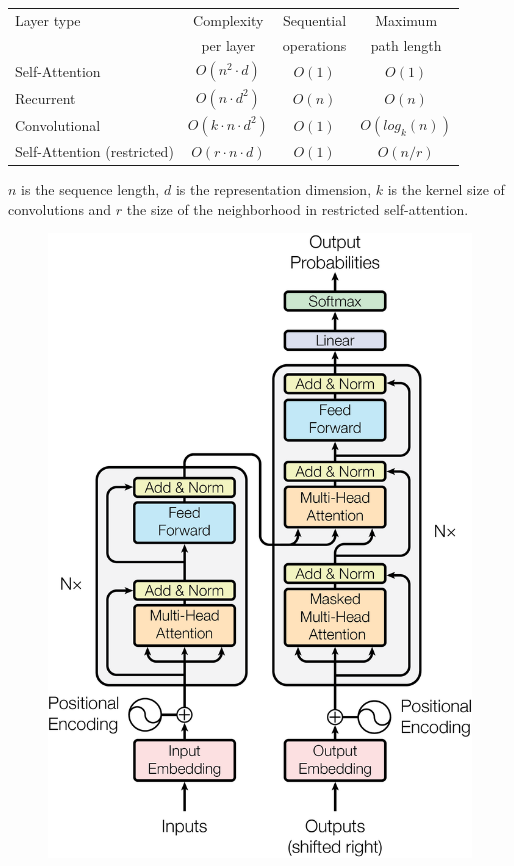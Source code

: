 \begin{table}
\centering
\begin{tabular}{l|ccc}
\toprule
Layer type        &   Complexity             &  Sequential & Maximum        \\
                  &   per layer              &  operations & path length    \\
\midrule
Self-Attention    & $O(n^2 \cdot d)$         & $O(1)$      & $O(1)$         \\
Recurrent         & $O(n \cdot d^2)$         & $O(n)$      & $O(n)$         \\
Convolutional     & $O(k \cdot n \cdot d^2)$ & $O(1)$      & $O(log_k (n))$ \\
Self-Attention (restricted) & $O(r \cdot n \cdot d)$       & $O(1)$ & $O(n/r)$  \\
\bottomrule
\end{tabular}
 {
	$n$ is the sequence length, 
	$d$ is the representation dimension, 
	$k$ is the kernel size of convolutions and 
	$r$ the size of the neighborhood in restricted self-attention.
}
\label{tab:layer_complexity_comp}
\end{table}


\begin{figure}[h]
	\centering
	\includegraphics[width=0.9\columnwidth]{../img/transformer_architecture.png}
	 {}
	\label{fig:transformer_architecture}
\end{figure}


